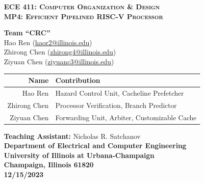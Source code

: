 \documentclass[12pt, a4paper]{article}
\begin{document}
    \begin{titlepage}
        \begin{center}

            \vspace*{3cm}
            {\LARGE \textbf{\textsc{ECE 411: Computer Organization \& Design}}} \\
            \vspace{.5cm}
            {\large \textbf{\textsc{MP4: Efficient Pipelined RISC-V Processor}}} \\
            \vspace{2cm}

            {\large \textbf{Team ``CRC''}} \\
            \vspace{.5cm}
            Hao Ren (\href{mailto:haor2@illinois.edu}{haor2@illinois.edu}) \\
            Zhirong Chen (\href{mailto:zhirong4@illinois.edu}{zhirong4@illinois.edu}) \\
            Ziyuan Chen (\href{mailto:ziyuanc3@illinois.edu}{ziyuanc3@illinois.edu}) \\

            \vspace{1cm}
            \begin{table}[h]
                \centering
                \begin{tabular}{rl}
                    \hline
                    \textbf{Name} & \textbf{Contribution} \\
                    \hline
                    Hao Ren & Hazard Control Unit, Cacheline Prefetcher \\
                    Zhirong Chen & Processor Verification, Branch Predictor \\
                    Ziyuan Chen & Forwarding Unit, Arbiter, Customizable Cache \\
                    \hline
                \end{tabular}
            \end{table}

            \vspace{2cm}
            \textbf{Teaching Assistant:} Nicholas R. Satchanov \\
            \vspace{2cm}
            \textbf{Department of Electrical and Computer Engineering} \\
            \textbf{University of Illinois at Urbana-Champaign} \\
            \textbf{Champaign, Illinois 61820} \\
            \textbf{12/15/2023}

        \end{center}
    \end{titlepage}
\end{document}
